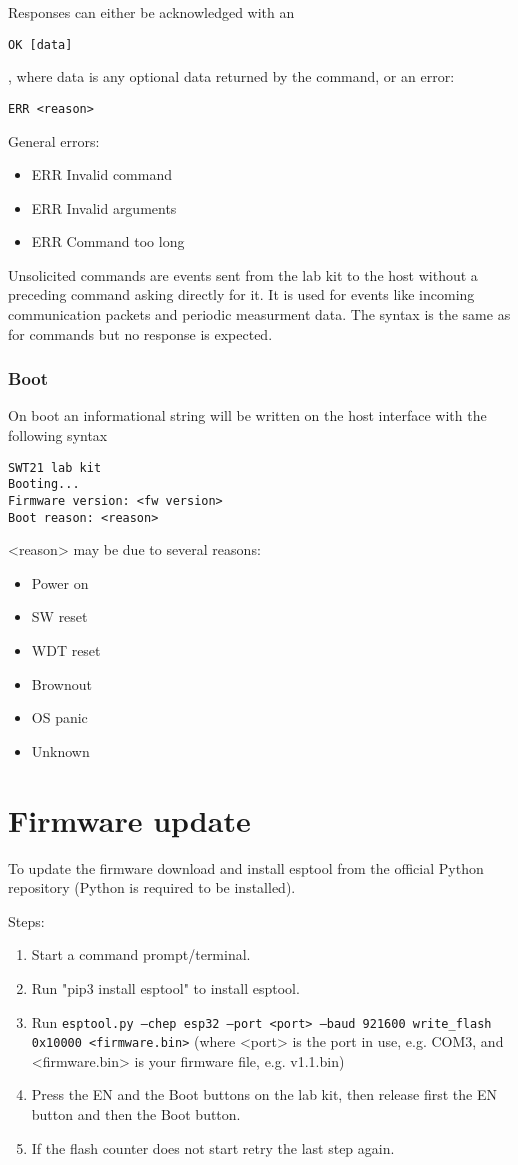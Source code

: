 \documentclass{article}[a4paper]
\begin{document}
Responses can either be acknowledged with an
\begin{verbatim}
OK [data]
\end{verbatim}
, where data is any optional data returned by the command, or an error:
\begin{verbatim}
ERR <reason>
\end{verbatim}

General errors:
\begin{itemize}[noitemsep]
\item ERR Invalid command
\item ERR Invalid arguments
\item ERR Command too long
\end{itemize}

Unsolicited commands are events sent from the lab kit to the host without a
preceding command asking directly for it. It is used for events like incoming
communication packets and periodic measurment data. The syntax is the same as
for commands but no response is expected.

\subsubsection{Boot}
On boot an informational string will be written on the host interface with
the following syntax

\begin{verbatim}
SWT21 lab kit
Booting...
Firmware version: <fw version>
Boot reason: <reason>
\end{verbatim}

<reason> may be due to several reasons:
\begin{itemize}[noitemsep]
\item Power on
\item SW reset
\item WDT reset
\item Brownout
\item OS panic
\item Unknown
\end{itemize}

\section{Firmware update}
To update the firmware download and install esptool from the official Python
repository (Python is required to be installed).

Steps:
\begin{enumerate}
\item Start a command prompt/terminal.
\item Run "pip3 install esptool" to install esptool.
\item Run \texttt{esptool.py --chep esp32 --port <port> --baud 921600 write\_flash 0x10000 <firmware.bin>} (where <port> is the port in use, e.g. COM3, and <firmware.bin> is your firmware file, e.g. v1.1.bin)
\item Press the EN and the Boot buttons on the lab kit, then release first the EN
      button and then the Boot button.
\item If the flash counter does not start retry the last step again.
\end{enumerate}
\end{document}
